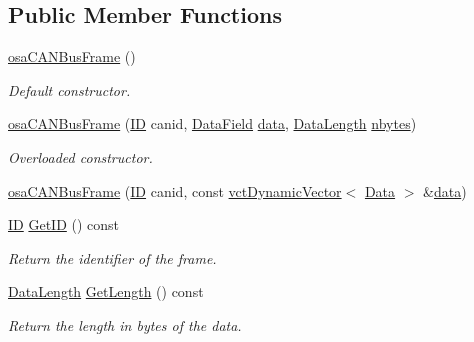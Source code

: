 \subsection*{Public Member Functions}
\begin{DoxyCompactItemize}
\item 
\hyperlink{classosa_c_a_n_bus_frame_a2615199c847dd3ed03b7414c5c1c473d}{osa\+C\+A\+N\+Bus\+Frame} ()
\begin{DoxyCompactList}\small\item\em Default constructor. \end{DoxyCompactList}\item 
\hyperlink{classosa_c_a_n_bus_frame_a76d0e5885c53c1730b387315b2dd9d3c}{osa\+C\+A\+N\+Bus\+Frame} (\hyperlink{classosa_c_a_n_bus_frame_ae917bcfe6427b2055a405716909c6048}{I\+D} canid, \hyperlink{classosa_c_a_n_bus_frame_ac41162892eefb85a1308d485ec630969}{Data\+Field} \hyperlink{classosa_c_a_n_bus_frame_ae5114021468fe3ca35f95ec123db1e2d}{data}, \hyperlink{classosa_c_a_n_bus_frame_ab5bacbd4959a9046925438af889744f4}{Data\+Length} \hyperlink{classosa_c_a_n_bus_frame_abc694b0742e9c5b7e2db8640caa17565}{nbytes})
\begin{DoxyCompactList}\small\item\em Overloaded constructor. \end{DoxyCompactList}\item 
\hyperlink{classosa_c_a_n_bus_frame_a93601457f3b5e4254a3ed9b11d790f1d}{osa\+C\+A\+N\+Bus\+Frame} (\hyperlink{classosa_c_a_n_bus_frame_ae917bcfe6427b2055a405716909c6048}{I\+D} canid, const \hyperlink{classvct_dynamic_vector}{vct\+Dynamic\+Vector}$<$ \hyperlink{classosa_c_a_n_bus_frame_a938f540c9de33b240d3bc4f21c341ba5}{Data} $>$ \&\hyperlink{classosa_c_a_n_bus_frame_ae5114021468fe3ca35f95ec123db1e2d}{data})
\item 
\hyperlink{classosa_c_a_n_bus_frame_ae917bcfe6427b2055a405716909c6048}{I\+D} \hyperlink{classosa_c_a_n_bus_frame_ab70017817004bc49297fbc303a5a0919}{Get\+I\+D} () const 
\begin{DoxyCompactList}\small\item\em Return the identifier of the frame. \end{DoxyCompactList}\item 
\hyperlink{classosa_c_a_n_bus_frame_ab5bacbd4959a9046925438af889744f4}{Data\+Length} \hyperlink{classosa_c_a_n_bus_frame_a4dac9f774e50ee0396481400d0179768}{Get\+Length} () const 
\begin{DoxyCompactList}\small\item\em Return the length in bytes of the data. \end{DoxyCompactList}\item 

\end{DoxyCompactItemize}
